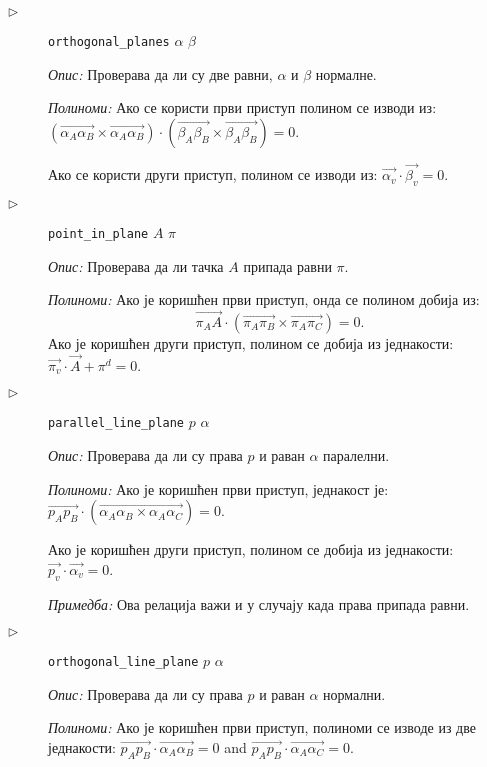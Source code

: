 \begin{description}


\item[$\triangleright$] {\tt orthogonal\_planes} $\alpha$ $\beta$

{\em Опис:} Проверава да ли су две равни, $\alpha$ и $\beta$ нормалне.

{\em Полиноми:} 
Ако се користи први приступ полином се изводи из: 
$(\overrightarrow{\alpha_A\alpha_B} \times \overrightarrow{\alpha_A\alpha_B}) \cdot (\overrightarrow{\beta_A\beta_B} \times \overrightarrow{\beta_A\beta_B}) = 0$.

Ако се користи други приступ, полином се изводи из:
$\overrightarrow{\alpha_v} \cdot \overrightarrow{\beta_v} = 0$.

\item[$\triangleright$] {\tt point\_in\_plane} $A$ $\pi$

{\em Опис:} Проверава да ли тачка $A$ припада равни $\pi$.

{\em Полиноми:} Ако је коришћен први приступ, онда се полином добија из:
$$\overrightarrow{\pi_AA}\cdot (\overrightarrow{\pi_A\pi_B} \times \overrightarrow{\pi_A\pi_C}) = 0.$$
Ако је коришћен други приступ, полином се добија из једнакости:
$\overrightarrow{\pi_v} \cdot \overrightarrow{A} + \pi^{d} = 0$.

\item[$\triangleright$] {\tt parallel\_line\_plane} $p$ $\alpha$

{\em Опис:} Проверава да ли су права $p$ и раван $\alpha$ паралелни.

{\em Полиноми:} 
Ако је коришћен први приступ, једнакост је:
$\overrightarrow{p_Ap_B} \cdot (\overrightarrow{\alpha_A\alpha_B \times \alpha_A\alpha_C}) = 0$.

Ако је коришћен други приступ, полином се добија из једнакости:
$\overrightarrow{p_v} \cdot \overrightarrow{\alpha_v} = 0$.

{\em Примедба:} Ова релација важи и у случају када права припада равни.

\item[$\triangleright$] {\tt orthogonal\_line\_plane} $p$ $\alpha$

{\em Опис:} Проверава да ли су права $p$ и раван $\alpha$ нормални.

{\em Полиноми:} Ако је коришћен први приступ, полиноми се изводе из две једнакости:
$\overrightarrow{p_Ap_B} \cdot \overrightarrow{\alpha_A\alpha_B} = 0$ and
$\overrightarrow{p_Ap_B} \cdot \overrightarrow{\alpha_A\alpha_C} = 0$.


\end{description}

